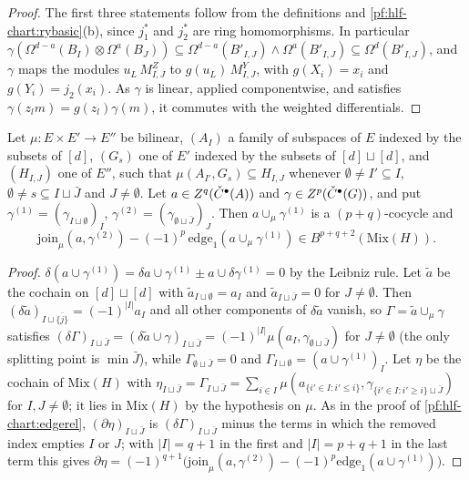 \begin{proof}
The first three statements follow from the definitions and \cref{pf:hlf-chart:rybasic}(b), since $j_1^*$ and $j_2^*$ are ring homomorphisms. In
particular $\gamma(\Omega^{d-a}(B_I)\otimes\Omega^a(B_J))\subseteq\Omega^{d-a}(B'_{I,J})\wedge\Omega^a(B'_{I,J})\subseteq\Omega^d(B'_{I,J})$, and $\gamma$
maps the modules $u_L\,M^Z_{I,J}$ to $g(u_L)\,M^Y_{I,J}$, with $g(X_i)=x_i$ and $g(Y_i)=j_2(x_i)$. As $\gamma$ is linear, applied componentwise, and
satisfies $\gamma(z_l m)=g(z_l)\gamma(m)$, it commutes with the weighted differentials.
\end{proof}

\begin{lemma}\label{pf:hlf-chart:lcup}
Let $\mu\colon E\times E'\to E''$ be bilinear, $(A_I)$ a family of subspaces of $E$ indexed by the subsets of $[d]$, $(G_s)$ one of $E'$ indexed by
the subsets of $[d]\sqcup[d]$, and $(H_{I,J})$ one of $E''$, such that $\mu(A_{I'},G_s)\subseteq H_{I,J}$ whenever $\emptyset\ne I'\subseteq I$,
$\emptyset\ne s\subseteq I\sqcup\bar J$ and $J\ne\emptyset$. Let $a\in Z^q(\check{C}^\bullet(A))$ and $\gamma\in Z^p(\check{C}^\bullet(G))$, and put
$\gamma^{(1)}=(\gamma_{I\sqcup\emptyset})_I$, $\gamma^{(2)}=(\gamma_{\emptyset\sqcup\bar J})_J$. Then $a\cup_\mu\gamma^{(1)}$ is a $(p+q)$-cocycle and
\[
  \mathrm{join}_\mu(a,\gamma^{(2)})-(-1)^p\,\mathrm{edge}_1(a\cup_\mu\gamma^{(1)})\in B^{p+q+2}(\mathrm{Mix}(H)).
\]
\end{lemma}

\begin{proof}
$\delta(a\cup\gamma^{(1)})=\delta a\cup\gamma^{(1)}\pm a\cup\delta\gamma^{(1)}=0$ by the Leibniz rule. Let $\tilde a$ be the cochain on $[d]\sqcup[d]$
with $\tilde a_{I\sqcup\emptyset}=a_I$ and $\tilde a_{I\sqcup\bar J}=0$ for $J\ne\emptyset$. Then $(\delta\tilde a)_{I\sqcup\{\bar j\}}=(-1)^{|I|}a_I$ and
all other components of $\delta\tilde a$ vanish, so $\Gamma=\tilde a\cup_\mu\gamma$ satisfies
$(\delta\Gamma)_{I\sqcup\bar J}=(\delta\tilde a\cup\gamma)_{I\sqcup\bar J}=(-1)^{|I|}\mu(a_I,\gamma_{\emptyset\sqcup\bar J})$ for $J\ne\emptyset$ (the only
splitting point is $\min\bar J$), while $\Gamma_{\emptyset\sqcup\bar J}=0$ and $\Gamma_{I\sqcup\emptyset}=(a\cup\gamma^{(1)})_I$. Let $\eta$ be the
cochain of $\mathrm{Mix}(H)$ with $\eta_{I\sqcup\bar J}=\Gamma_{I\sqcup\bar J}=\sum_{i\in I}\mu(a_{\{i'\in I:i'\le i\}},\gamma_{\{i'\in I:i'\ge i\}\sqcup\bar J})$
for $I,J\ne\emptyset$; it lies in $\mathrm{Mix}(H)$ by the hypothesis on $\mu$. As in the proof of \cref{pf:hlf-chart:edgerel},
$(\partial\eta)_{I\sqcup\bar J}$ is $(\delta\Gamma)_{I\sqcup\bar J}$ minus the terms in which the removed index empties $I$ or $J$; with $|I|=q+1$ in the
first and $|I|=p+q+1$ in the last term this gives
$\partial\eta=(-1)^{q+1}\bigl(\mathrm{join}_\mu(a,\gamma^{(2)})-(-1)^p\mathrm{edge}_1(a\cup\gamma^{(1)})\bigr)$.
\end{proof}

